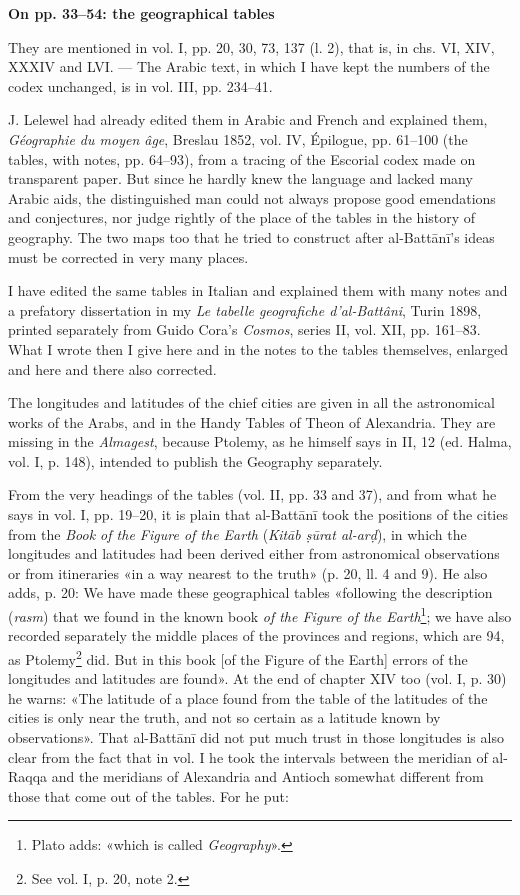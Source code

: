 \documentclass[11pt]{article}
\newcommand{\Pg}[1]{\marginpar{\footnotesize\color{gray}#1}}
\newcommand{\UnitHead}[2]{\par\setcounter{footnoteT}{0}\needspace{8\baselineskip}\bigskip\pdfbookmark[1]{#1}{unit-#2}\hypertarget{EN-#2}{}%
 {\large\bfseries\interlinepenalty=10000 #1\par}\nobreak\medskip}
\begin{document}
\UnitHead{On pp. 33–54: the geographical tables}{T09}
\par They are mentioned in vol. I, pp. 20, 30, 73, 137 (l. 2), that is, in chs. VI, XIV, XXXIV and LVI. — The Arabic text, in which I have kept the numbers of the codex unchanged, is in vol. III, pp. 234–41.\par
\par J. Lelewel had already edited them in Arabic and French and explained them, \emph{Géographie du moyen âge}, Breslau 1852, vol. IV, Épilogue, pp. 61–100 (the tables, with notes, pp. 64–93), from a tracing of the Escorial codex made on transparent paper. But since he hardly knew the language and lacked many Arabic aids, the distinguished man could not always propose good emendations and conjectures, nor judge rightly of the place of the tables in the history of geography. The two maps too that he tried to construct after al-Battānī's ideas must be corrected in very many places.\par
\par I have edited the same tables in Italian and explained them with many notes and a prefatory dissertation in my \emph{Le tabelle geografiche d'al-Battâni}, Turin 1898, printed separately from Guido Cora's \emph{Cosmos}, series II, vol. XII, pp. 161–83. What I wrote then I give here and in the notes to the tables themselves, enlarged and here and there also corrected.\par
\par The longitudes and latitudes of the chief cities are given in all the astronomical works of the Arabs, and in the Handy Tables of Theon of Alexandria. They are missing in the \emph{Almagest}, because Ptolemy, as he himself says in II, 12 (ed. Halma, vol. I, p. 148), intended to publish the Geography separately.\par
\par \Pg{II 210}From the very headings of the tables (vol. II, pp. 33 and 37), and from what he says in vol. I, pp. 19–20, it is plain that al-Battānī took the positions of the cities from the \emph{Book of the Figure of the Earth} (\emph{Kitāb ṣūrat al-arḍ}), in which the longitudes and latitudes had been derived either from astronomical observations or from itineraries «in a way nearest to the truth» (p. 20, ll. 4 and 9). He also adds, p. 20: We have made these geographical tables «following the description (\emph{rasm}) that we found in the known book \emph{of the Figure of the Earth}\footnote{Plato adds: «which is called \emph{Geography}».}; we have also recorded separately the middle places of the provinces and regions, which are 94, as Ptolemy\footnote{See vol. I, p. 20, note 2.} did. But in this book [of the Figure of the Earth] errors of the longitudes and latitudes are found». At the end of chapter XIV too (vol. I, p. 30) he warns: «The latitude of a place found from the table of the latitudes of the cities is only near the truth, and not so certain as a latitude known by observations». That al-Battānī did not put much trust in those longitudes is also clear from the fact that in vol. I he took the intervals between the meridian of al-Raqqa and the meridians of Alexandria and Antioch somewhat different from those that come out of the tables. For he put:\par
\end{document}
